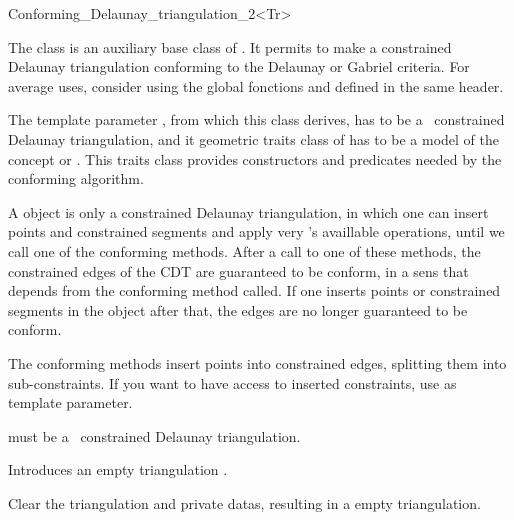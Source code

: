 \begin{ccRefClass}{Conforming_Delaunay_triangulation_2<Tr>}

The class \ccRefName{} is an auxiliary base class of
. It permits to make a constrained Delaunay
triangulation conforming to the Delaunay or Gabriel criteria. For average
uses, consider using the global fonctions 
and  defined in the same header.

The template parameter , from which this class derives, has to be a
\cgal\ constrained Delaunay triangulation, and it geometric traits class of
has to be a model of the concept
 or
. This traits class provides
constructors and predicates needed by the conforming algorithm.

A \ccRefName{} object is only a constrained Delaunay triangulation, in
which one can insert points and constrained segments and apply very
's availlable operations, until we call one of the conforming
methods. After a call to one of these methods, the constrained edges of the
CDT are guaranteed to be conform, in a sens that depends from the
conforming method called.  If one inserts points or constrained segments in
the \ccRefName{} object after that, the edges are no longer guaranteed to
be conform.

The conforming methods insert points into constrained edges, splitting 
them into sub-constraints. If you want to have access to inserted
constraints, use  as
template parameter.


\ccInheritsFrom


\ccRequirements

 must be a \cgal\ constrained Delaunay triangulation.

\ccTypes 
{}

\ccCreation
{}

{Introduces an empty triangulation \ccVar.}

\ccOperations

{ Clear the triangulation and private datas, resulting in a empty
  triangulation. }


\end{ccRefClass}

